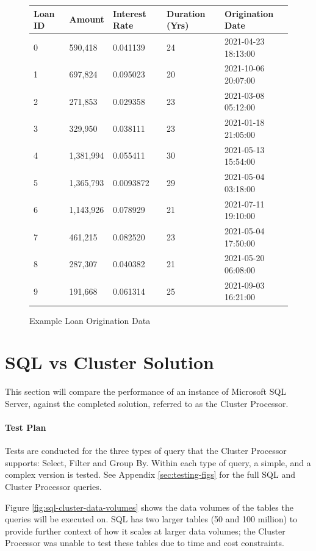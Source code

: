 \begin{figure}[ht]
	\centering
	\begin{tabular}{| l | l | l | l | l |}
		\hline
		\textbf{Loan ID} & \textbf{Amount} & \textbf{Interest Rate} & \textbf{Duration (Yrs)} & \textbf{Origination Date} \\ \hline 
		0 & 590,418 & 0.041139 & 24 & 2021-04-23 18:13:00   \\ \hline
		1 & 697,824 & 0.095023 & 20 & 2021-10-06 20:07:00    \\ \hline
		2 & 271,853 & 0.029358 & 23 & 2021-03-08 05:12:00    \\ \hline
		3 & 329,950 & 0.038111 & 23 & 2021-01-18 21:05:00    \\ \hline
		4 & 1,381,994 & 0.055411 & 30 & 2021-05-13 15:54:00  \\ \hline
		5 & 1,365,793 & 0.0093872 & 29 & 2021-05-04 03:18:00  \\ \hline
		6 & 1,143,926 & 0.078929 & 21 & 2021-07-11 19:10:00   \\ \hline
		7 & 461,215 & 0.082520 & 23 & 2021-05-04 17:50:00    \\ \hline
		8 & 287,307 & 0.040382 & 21 & 2021-05-20 06:08:00   \\ \hline
		9 & 191,668 & 0.061314 & 25 & 2021-09-03 16:21:00    \\ \hline
	\end{tabular}
	\caption{Example Loan Origination Data}
	\label{fig:fake-loan-data}
\end{figure}


\pagebreak
\section{SQL vs Cluster Solution}
This section will compare the performance of an instance of Microsoft SQL Server, against the completed solution, referred to as the Cluster Processor. 

\paragraph{Test Plan}
Tests are conducted for the three types of query that the Cluster Processor supports: Select, Filter and Group By. Within each type of query, a simple, and a complex version is tested. See Appendix \ref{sec:testing-figs} for the full SQL and Cluster Processor queries.

Figure \ref{fig:sql-cluster-data-volumes} shows the data volumes of the tables the queries will be executed on. SQL has two larger tables (50 and 100 million) to provide further context of how it scales at larger data volumes; the Cluster Processor was unable to test these tables due to time and cost constraints.

